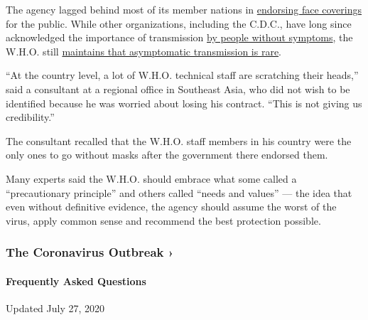 The agency lagged behind most of its member nations in
\href{https://www.nytimes.com/2020/06/05/health/coronavirus-masks-who.html}{endorsing
face coverings} for the public. While other organizations, including the
C.D.C., have long since acknowledged the importance of transmission
\href{https://www.nytimes.com/2020/06/27/world/europe/coronavirus-spread-asymptomatic.html}{by
people without symptoms}, the W.H.O. still
\href{https://www.nytimes.com/2020/06/09/health/coronavirus-asymptomatic-world-health-organization.html}{maintains
that asymptomatic transmission is rare}.

``At the country level, a lot of W.H.O. technical staff are scratching
their heads,'' said a consultant at a regional office in Southeast Asia,
who did not wish to be identified because he was worried about losing
his contract. ``This is not giving us credibility.''

The consultant recalled that the W.H.O. staff members in his country
were the only ones to go without masks after the government there
endorsed them.

Many experts said the W.H.O. should embrace what some called a
``precautionary principle'' and others called ``needs and values'' ---
the idea that even without definitive evidence, the agency should assume
the worst of the virus, apply common sense and recommend the best
protection possible.

\href{https://www.nytimes.com/news-event/coronavirus?action=click\&pgtype=Article\&state=default\&region=MAIN_CONTENT_3\&context=storylines_faq}{}

\hypertarget{the-coronavirus-outbreak-}{%
\subsubsection{The Coronavirus Outbreak
›}\label{the-coronavirus-outbreak-}}

\hypertarget{frequently-asked-questions}{%
\paragraph{Frequently Asked
Questions}\label{frequently-asked-questions}}

Updated July 27, 2020

